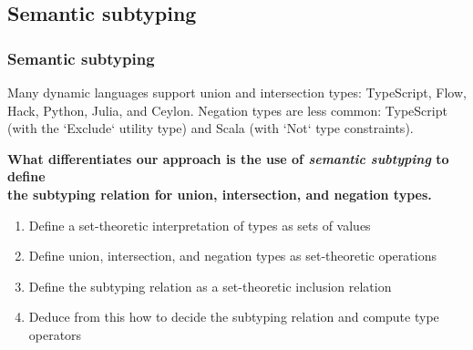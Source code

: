 \subsection{Semantic subtyping}
\begin{frame}
\frametitle{Semantic subtyping}

Many dynamic languages support union and intersection types: TypeScript, Flow, Hack, Python, Julia, and Ceylon. Negation types are less common: TypeScript (with the `Exclude` utility type) and Scala (with `Not` type constraints).

\pause\bigskip

\textbf{What differentiates our approach is the use of \emph{semantic subtyping} to define\\  the subtyping relation for union, intersection, and negation types.}

\bigskip

\begin{enumerate}
  \item<3-> Define a set-theoretic interpretation of types as sets of values
  \item<4-> Define union, intersection, and negation types as set-theoretic operations
  \item<5-> Define the subtyping relation as a set-theoretic inclusion relation
  \item<6-> Deduce from this how to decide the subtyping relation and compute type operators
  \end{enumerate}

\end{frame}

